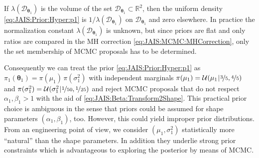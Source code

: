 If \(\lambda(\mathcal{D}_{\bm{\theta}_1})\) is the volume of the set \(\mathcal{D}_{\bm{\theta}_1} \subset \mathds{R}^2\),
then the uniform density \cref{eq:JAIS:Prior:Hyper:p1} is \(1/\lambda(\mathcal{D}_{\bm{\theta}_1})\) on \(\mathcal{D}_{\bm{\theta}_1}\) and zero elsewhere.
In practice the normalization constant \(\lambda(\mathcal{D}_{\bm{\theta}_1})\) is unknown, but since priors are flat and only ratios are compared in the MH correction \cref{eq:JAIS:MCMC:MHCorrection}, 
only the set membership of MCMC proposals has to be determined.
\par %
Consequently we can treat the prior \cref{eq:JAIS:Prior:Hyper:p1} as \(\pi_1(\bm{\theta}_1) = \pi(\mu_1) \, \pi(\sigma^2_1)\) with independent marginals
\(\pi(\mu_1) = \mathcal{U}(\mu_1 {\:\!}|{\:\!} \nicefrac{3}{5},\nicefrac{4}{5})\) and \(\pi(\sigma^2_1) = \mathcal{U}(\sigma^2_1 {\:\!}|{\:\!} \nicefrac{1}{50},\nicefrac{1}{25})\)
and reject MCMC proposals that do not respect \(\alpha_1,\beta_1 > 1\) with the aid of \cref{eq:JAIS:Beta:Transform2Shape}.
This practical prior choice is ambiguous in the sense that priors could be assumed for shape parameters \((\alpha_1,\beta_1)\), too.
However, this could yield improper prior distributions.
From an engineering point of view, we consider \((\mu_1,\sigma^2_1)\) statistically more ``natural'' than the shape parameters.
In addition they underlie strong prior constraints which is advantageous to exploring the posterior by means of MCMC.

